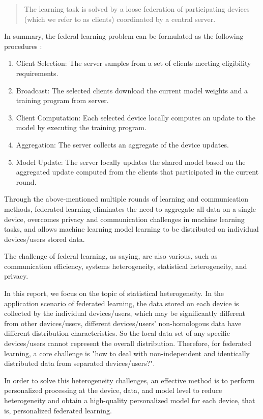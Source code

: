 \documentclass[a4paper,12pt,authoryear]{elegantpaper}
\begin{document}
\begin{quote}
    The learning task is solved by a loose federation of participating devices (which we refer to as clients) coordinated by a central server.
\end{quote}

In summary, the federal learning problem can be formulated as the following procedures \citep{kairouz_advances_2021}:
\begin{enumerate}
    \item Client Selection: The server samples from a set of clients meeting eligibility requirements.
    \item Broadcast: The selected clients download the current model weights and a training program from server.
    \item Client Computation: Each selected device locally computes an update to the model by executing the training program.
    \item Aggregation: The server collects an aggregate of the device updates.
    \item Model Update: The server locally updates the shared model based on the aggregated update computed from the clients that participated in the current round.
\end{enumerate}

Through the above-mentioned multiple rounds of learning and communication methods, federated learning eliminates the need to aggregate all data on a single device, overcomes privacy and communication challenges in machine learning tasks, and allows machine learning model learning to be distributed on individual devices/users stored data.

The challenge of federal learning, as \cite{li_federated_2020} saying, are also various, such as communication efficiency, systems heterogeneity, statistical heterogeneity, and privacy.

In this report, we focus on the topic of statistical heterogeneity. In the application scenario of federated learning, the data stored on each device is collected by the individual devices/users, which may be significantly different from other devices/users, different devices/users' non-homologous data have different distribution characteristics. So the local data set of any specific devices/users cannot represent the overall distribution. Therefore, for federated learning, a core challenge is "how to deal with non-independent and identically distributed data from separated devices/users?".

In order to solve this heterogeneity challenges, an effective method is to perform personalized processing at the device, data, and model level to reduce heterogeneity and obtain a high-quality personalized model for each device, that is, personalized federated learning.
\end{document}
